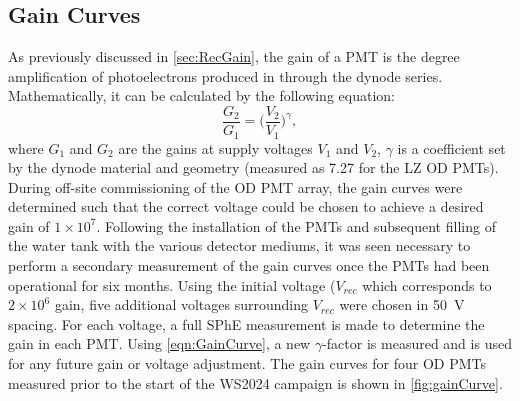 \subsection{Gain Curves}
As previously discussed in \autoref{sec:RecGain}, the gain of a PMT is the degree amplification of photoelectrons produced in through the dynode series. Mathematically, it can be calculated by the following equation:
\begin{equation}
    \label{eqn:GainCurve}
    \frac{G_2}{G_1}=\biggl(\frac{V_2}{V_1}\biggl)^\gamma,
\end{equation}
where $G_1$ and $G_2$ are the gains at supply voltages $V_1$ and $V_2$, $\gamma$ is a coefficient set by the dynode material and geometry (measured as 7.27 for the LZ OD PMTs). During off-site commissioning of the OD PMT array, the gain curves were determined such that the correct voltage could be chosen to achieve a desired gain of $1\times10^7$. Following the installation of the PMTs and subsequent filling of the water tank with the various detector mediums, it was seen necessary to perform a secondary measurement of the gain curves once the PMTs had been operational for six months.
Using the initial voltage ($V_{rec}$ which corresponds to $2\times10^6$ gain, five additional voltages surrounding $V_{rec}$ were chosen in 50~V spacing. For each voltage, a full SPhE measurement is made to determine the gain in each PMT. Using \autoref{eqn:GainCurve}, a new $\gamma$-factor is measured and is used for any future gain or voltage adjustment. The gain curves for four OD PMTs measured prior to the start of the WS2024 campaign is shown in \autoref{fig:gainCurve}.

